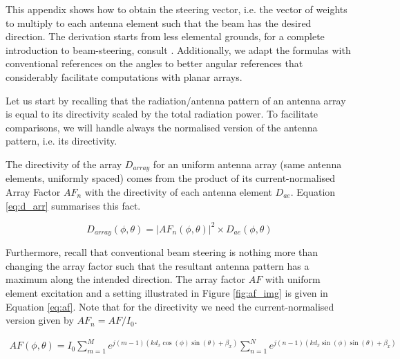 \label{sec:beam_steering}

This appendix shows how to obtain the steering vector, i.e. the vector of weights to multiply to each antenna element such that the beam has the desired direction. The derivation starts from less elemental grounds, for a complete introduction to beam-steering, consult \cite{balanis_antennas}. Additionally, we adapt the formulas with conventional references on the angles to better angular references that considerably facilitate computations with planar arrays.

Let us start by recalling that the radiation/antenna pattern of an antenna array is equal to its directivity scaled by the total radiation power. To facilitate comparisons, we will handle always the normalised version of the antenna pattern, i.e. its directivity. 

The directivity of the array $D_{array}$ for an uniform antenna array (same antenna elements, uniformly spaced) comes from the product of its current-normalised Array Factor $AF_n$ with the directivity of each antenna element $D_{ae}$. Equation \eqref{eq:d_arr} summarises this fact.

\begin{equation} \label{eq:d_arr}
    D_{array}(\phi, \theta) = \left|AF_n(\phi, \theta)\right|^2 \times D_{ae}(\phi, \theta)
\end{equation}

Furthermore, recall that conventional beam steering is nothing more than changing the array factor such that the resultant antenna pattern has a maximum along the intended direction. The array factor $AF$ with uniform element excitation and a setting illustrated in Figure \ref{fig:af_img} is given in Equation \eqref{eq:af}. Note that for the directivity we need the current-normalised version given by $AF_n = AF / I_0$.




\begin{align}
    AF(\phi, \theta) = I_0 \sum_{m=1}^{M} e^{j (m-1) \left(k d_x \cos(\phi)\sin(\theta) + \beta_x\right)} \sum_{n=1}^{N} e^{j (n-1) \left(k d_x \sin(\phi)\sin(\theta) + \beta_x\right)} \label{eq:af}
\end{align}


